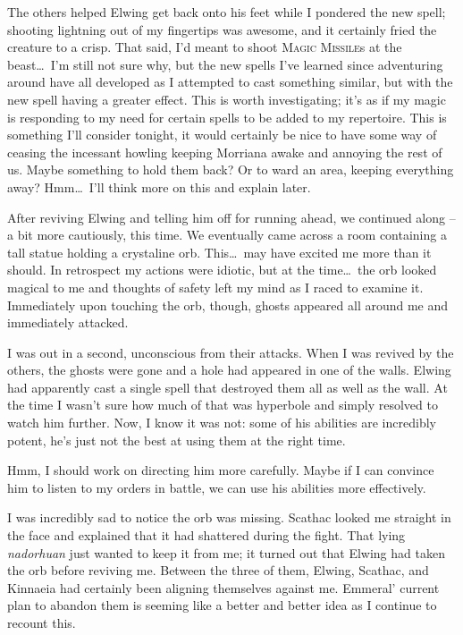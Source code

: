 The others helped Elwing get back onto his feet while I pondered the new spell; shooting lightning out of my fingertips was awesome, and it certainly fried the creature to a crisp. That said, I'd meant to shoot \textsc{Magic Missile}s at the beast\dots\ I'm still not sure why, but the new spells I've learned since adventuring around have all developed as I attempted to cast something similar, but with the new spell having a greater effect. This is worth investigating; it's as if my magic is responding to my need for certain spells to be added to my repertoire. This is something I'll consider tonight, it would certainly be nice to have some way of ceasing the incessant howling keeping Morriana awake and annoying the rest of us. Maybe something to hold them back? Or to ward an area, keeping everything away? Hmm\dots\ I'll think more on this and explain later.

After reviving Elwing and telling him off for running ahead, we continued along -- a bit more cautiously, this time. We eventually came across a room containing a tall statue holding a crystaline orb. This\dots\ may have excited me more than it should. In retrospect my actions were idiotic, but at the time\dots\ the orb looked magical to me and thoughts of safety left my mind as I raced to examine it. Immediately upon touching the orb, though, ghosts appeared all around me and immediately attacked.

I was out in a second, unconscious from their attacks. When I was revived by the others, the ghosts were gone and a hole had appeared in one of the walls. Elwing had apparently cast a single spell that destroyed them all as well as the wall. At the time I wasn't sure how much of that was hyperbole and simply resolved to watch him further. Now, I know it was not: some of his abilities are incredibly potent, he's just not the best at using them at the right time.

Hmm, I should work on directing him more carefully. Maybe if I can convince him to listen to my orders in battle, we can use his abilities more effectively.

I was incredibly sad to notice the orb was missing. Scathac looked me straight in the face and explained that it had shattered during the fight. That lying \emph{nadorhuan} just wanted to keep it from me; it turned out that Elwing had taken the orb before reviving me. Between the three of them, Elwing, Scathac, and Kinnaeia had certainly been aligning themselves against me. Emmeral' current plan to abandon them is seeming like a better and better idea as I continue to recount this.


